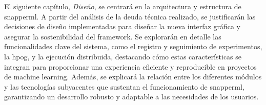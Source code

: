 El siguiente capítulo, \textit{Diseño}, se centrará en la arquitectura y estructura de \Gls{snapperml}. A partir del análisis de la \gls{deuda} técnica realizado, se justificarán las decisiones de diseño implementadas para diseñar la nueva interfaz gráfica y asegurar la sostenibilidad del framework. Se explorarán en detalle las funcionalidades clave del sistema, como el registro y seguimiento de experimentos, la \gls{hpog}, y la ejecución distribuida, destacando cómo estas características se integran para proporcionar una experiencia eficiente y reproducible en proyectos de machine learning. Además, se explicará la relación entre los diferentes módulos y las tecnologías subyacentes que sustentan el funcionamiento de \Gls{snapperml}, garantizando un desarrollo robusto y adaptable a las necesidades de los usuarios.